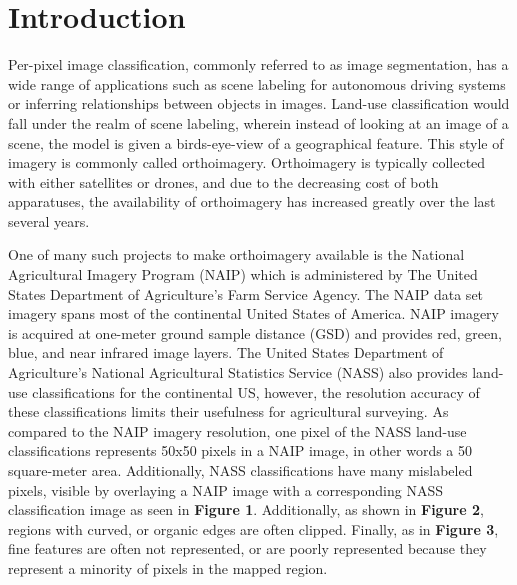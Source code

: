 \documentclass[12pt]{article}
\begin{document}
\newpage

\section{Introduction}

Per-pixel image classification, commonly referred to as image segmentation, has a wide range of applications such as scene labeling for autonomous driving systems or inferring relationships between objects in images. Land-use classification would fall under the realm of scene labeling, wherein instead of looking at an image of a scene, the model is given a birds-eye-view of a geographical feature. This style of imagery is commonly called orthoimagery. Orthoimagery is typically collected with either satellites or drones, and due to the decreasing cost of both apparatuses, the availability of orthoimagery has increased greatly over the last several years. 

One of many such projects to make orthoimagery available is the National Agricultural Imagery Program (NAIP) which is administered by The United States Department of Agriculture's Farm Service Agency. The NAIP data set imagery spans most of the continental United States of America. NAIP imagery is acquired at one-meter ground sample distance (GSD) and provides red, green, blue, and near infrared image layers. The United States Department of Agriculture's National Agricultural Statistics Service (NASS) also provides land-use classifications for the continental US, however, the resolution accuracy of these classifications limits their usefulness for agricultural surveying. As compared to the NAIP imagery resolution, one pixel of the NASS land-use classifications represents 50x50 pixels in a NAIP image, in other words a 50 square-meter area. Additionally, NASS classifications have many mislabeled pixels, visible by overlaying a NAIP image with a corresponding NASS classification image as seen in \textbf{Figure 1}. Additionally, as shown in \textbf{Figure 2}, regions with curved, or organic edges are often clipped. Finally, as in \textbf{Figure 3}, fine features are often not represented, or are poorly represented because they represent a minority of pixels in the mapped region.
\end{document}
